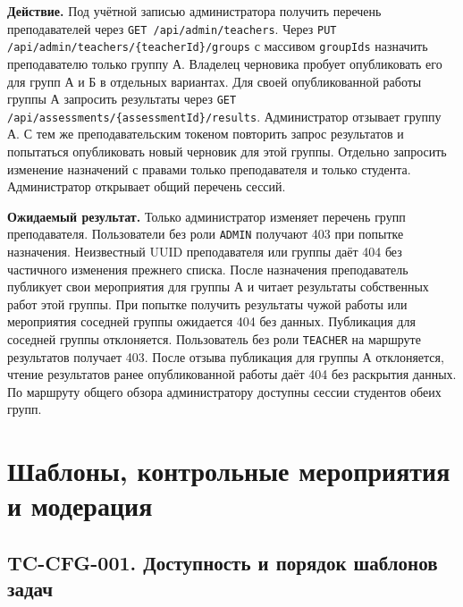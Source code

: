 \documentclass[12pt,a4paper]{article}
\begin{document}
\textbf{Действие.} Под учётной записью администратора получить перечень преподавателей через \texttt{GET /\allowbreak{}api/\allowbreak{}admin/\allowbreak{}teachers}. Через \texttt{PUT /\allowbreak{}api/\allowbreak{}admin/\allowbreak{}teachers/\allowbreak{}\{teacher\allowbreak{}Id\}/\allowbreak{}groups} с массивом \texttt{groupIds} назначить преподавателю только группу А. Владелец черновика пробует опубликовать его для групп А и Б в отдельных вариантах. Для своей опубликованной работы группы А запросить результаты через \texttt{GET /\allowbreak{}api/\allowbreak{}assessments/\allowbreak{}\{assessment\allowbreak{}Id\}/\allowbreak{}results}. Администратор отзывает группу А. С тем же преподавательским токеном повторить запрос результатов и попытаться опубликовать новый черновик для этой группы. Отдельно запросить изменение назначений с правами только преподавателя и только студента. Администратор открывает общий перечень сессий.

\textbf{Ожидаемый результат.} Только администратор изменяет перечень групп преподавателя. Пользователи без роли \texttt{ADMIN} получают 403 при попытке назначения. Неизвестный UUID преподавателя или группы даёт 404 без частичного изменения прежнего списка. После назначения преподаватель публикует свои мероприятия для группы А и читает результаты собственных работ этой группы. При попытке получить результаты чужой работы или мероприятия соседней группы ожидается 404 без данных. Публикация для соседней группы отклоняется. Пользователь без роли \texttt{TEACHER} на маршруте результатов получает 403. После отзыва публикация для группы А отклоняется, чтение результатов ранее опубликованной работы даёт 404 без раскрытия данных. По маршруту общего обзора администратору доступны сессии студентов обеих групп.

\section{Шаблоны, контрольные мероприятия и модерация}\label{ux448ux430ux431ux43bux43eux43dux44b-ux43aux43eux43dux442ux440ux43eux43bux44cux43dux44bux435-ux43cux435ux440ux43eux43fux440ux438ux44fux442ux438ux44f-ux438-ux43cux43eux434ux435ux440ux430ux446ux438ux44f}

\hypertarget{шаблоны-контрольные-мероприятия-и-модерация}{}

\subsection{TC-CFG-001. Доступность и порядок шаблонов задач}\label{tc-cfg-001-ux434ux43eux441ux442ux443ux43fux43dux43eux441ux442ux44c-ux438-ux43fux43eux440ux44fux434ux43eux43a-ux448ux430ux431ux43bux43eux43dux43eux432-ux437ux430ux434ux430ux447}
\end{document}
